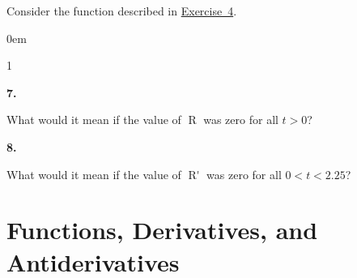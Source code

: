 \documentclass[12pt,]{book}
\newcommand{\lt}{<}
\newcommand{\gt}{>}
\theoremstyle{plain}
\theoremstyle{definition}
\numberwithin{equation}{section}
\newenvironment{exercisegroup}%
{\medskip\noindent}%
{\par\bigskip}%
\newlength{\exercisegroupindent}%
\newlength{\exercisegroupitemwidth}%
\newenvironment{exercisegrouplist}%
{\vspace{-\partopsep}%
\begin{adjustwidth}{\exercisegroupindent}{0em}}%
{\end{adjustwidth}%
\vspace{-\partopsep}%
\vspace{\baselineskip}}%
\newenvironment{exercisegroupbycol}[1]%
{\begin{exercisegrouplist}%
\vspace{-\multicolsep}%
\begin{multicols}{#1}%
\setlength{\parindent}{0em}%
\setlength{\exercisegroupitemwidth}{\linewidth}}%
{\end{multicols}%
\vspace{-\multicolsep}%
\end{exercisegrouplist}}%
\newenvironment{exercisegroupitem}[1]%
{\begin{minipage}[t]{\exercisegroupitemwidth}
\vspace{0pt}%
{\bfseries#1}%
\rule{0pt}{\baselineskip}}{\strut%
\end{minipage}%
\hspace{\columnsep}}%
\providecommand\phantomsection{}
\newcommand{\fe}[2]{\mathop{{#1}{\left(#2\right)}}}
\newcommand{\fd}[1]{#1'}
\begin{document}
\begin{exercisegroup}%
Consider the function described in \hyperref[exercise-bathtub-rate]{Exercise~4}.%
\begin{exercisegroupbycol}{1}%
\begin{exercisegroupitem}{7. }\phantomsection\hypertarget{exercise-143}{\null}
What would it mean if the value of \(\fe{R}{t}\) was zero for all \(t\gt0\)?%
\end{exercisegroupitem}%
\par%
\begin{exercisegroupitem}{8. }\phantomsection\hypertarget{exercise-144}{\null}
What would it mean if the value of \(\fe{\fd{R}}{t}\) was zero for all \(0\lt t\lt2.25\)?%
\end{exercisegroupitem}%
\par%
\end{exercisegroupbycol}%
\end{exercisegroup}%
\typeout{************************************************}
\typeout{************************************************}
\chapter[Functions, Derivatives, and Antiderivatives]{Functions, Derivatives, and Antiderivatives}\label{chapter-functions-derivatives-antiderivatives}
\typeout{************************************************}
\typeout{************************************************}
\end{document}
